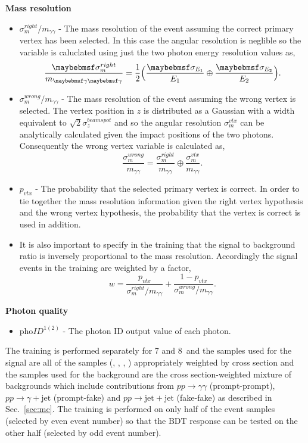 \noindent\textbf{Mass resolution}
\begin{itemize}
  \item $\sigma_{m}^{right}/m_{\gamma\gamma}$ - The mass resolution of the event assuming the correct primary vertex has been selected. In this case the angular resolution is neglible so the variable is caluclated using just the two photon energy resolution values as,
    \begin{equation}
      \frac{\sigma_{m}^{right}}{m_{\gamma\gamma}} = \frac{1}{2}\Bigl(\frac{\sigma_{E_{1}}}{E_{1}} \oplus \frac{\sigma_{E_{2}}}{E_{2}}\Bigr).
    \end{equation}
  \item $\sigma_{m}^{wrong}/m_{\gamma\gamma}$ - The mass resolution of the event assuming the wrong vertex is selected. The vertex position in $z$ is distributed as a Gaussian with a width equivalent to $\sqrt{2}\sigma_{z}^{beamspot}$ and so the angular resolution $\sigma_{m}^{vtx}$ can be analytically calculated given the \ECAL impact positions of the two photons. Consequently the wrong vertex variable is calculated as,
    \begin{equation}
      \frac{\sigma_{m}^{wrong}}{m_{\gamma\gamma}} = \frac{\sigma_{m}^{right}}{m_{\gamma\gamma}} \oplus \frac{\sigma_{m}^{vtx}}{m_{\gamma\gamma}}.
    \end{equation}
  \item $p_{vtx}$ - The probability that the selected primary vertex is correct. In order to tie together the mass resolution information given the right vertex hypothesis and the wrong vertex hypothesis, the probability that the vertex is correct is used in addition.
  \item It is also important to specify in the training that the signal to background ratio is inversely proportional to the mass resolution. Accordingly the signal events in the training are weighted by a factor,
    \begin{equation}
      w = \frac{p_{vtx}}{\sigma_{m}^{right}/m_{\gamma\gamma}} + \frac{1-p_{vtx}}{\sigma_{m}^{wrong}/m_{\gamma\gamma}}.
    \end{equation}
\end{itemize}

\noindent\textbf{Photon quality}
\begin{itemize}
  \item pho$ID^{1(2)}$ - The photon ID \BDT output value of each photon.
\end{itemize}

The training is performed separately for 7 and 8~\TeV and the samples used for the signal are all of the \SM \Hgg \MC samples (\ggH, \VBF, \VH, \ttH) appropriately weighted by cross section and the samples used for the background are the cross section-weighted mixture of \SM backgrounds which include contributions from $pp\rightarrow\gamma\gamma$ (prompt-prompt), $pp\rightarrow\gamma+\mathrm{jet}$ (prompt-fake) and $pp\rightarrow\mathrm{jet+jet}$ (fake-fake) as described in Sec.~\ref{sec:mc}. The training is performed on only half of the event samples (selected by even event number) so that the BDT response can be tested on the other half (selected by odd event number).

